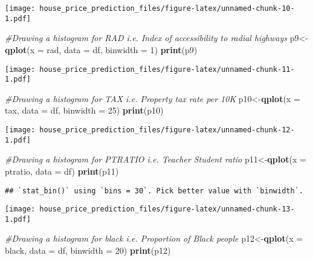 \documentclass[
]{article}
\newenvironment{Shaded}{\begin{snugshade}}{\end{snugshade}}
\newcommand{\CommentTok}[1]{\textcolor[rgb]{0.56,0.35,0.01}{\textit{#1}}}
\newcommand{\DataTypeTok}[1]{\textcolor[rgb]{0.13,0.29,0.53}{#1}}
\newcommand{\DecValTok}[1]{\textcolor[rgb]{0.00,0.00,0.81}{#1}}
\newcommand{\KeywordTok}[1]{\textcolor[rgb]{0.13,0.29,0.53}{\textbf{#1}}}
\newcommand{\NormalTok}[1]{#1}
\begin{document}
\texttt{[image: house\_price\_prediction\_files/figure-latex/unnamed-chunk-10-1.pdf]}

\begin{Shaded}
\begin{Highlighting}[]
\CommentTok{#Drawing a histogram for RAD i.e. Index of accessibility to radial highways}
\NormalTok{p9<-}\KeywordTok{qplot}\NormalTok{(}\DataTypeTok{x =}\NormalTok{ rad, }\DataTypeTok{data =}\NormalTok{ df, }\DataTypeTok{binwidth =} \DecValTok{1}\NormalTok{)}
\KeywordTok{print}\NormalTok{(p9)}
\end{Highlighting}
\end{Shaded}

\texttt{[image: house\_price\_prediction\_files/figure-latex/unnamed-chunk-11-1.pdf]}

\begin{Shaded}
\begin{Highlighting}[]
\CommentTok{#Drawing a histogram for TAX i.e. Property tax rate per 10K}
\NormalTok{p10<-}\KeywordTok{qplot}\NormalTok{(}\DataTypeTok{x =}\NormalTok{ tax, }\DataTypeTok{data =}\NormalTok{ df, }\DataTypeTok{binwidth =} \DecValTok{25}\NormalTok{)}
\KeywordTok{print}\NormalTok{(p10)}
\end{Highlighting}
\end{Shaded}

\texttt{[image: house\_price\_prediction\_files/figure-latex/unnamed-chunk-12-1.pdf]}

\begin{Shaded}
\begin{Highlighting}[]
\CommentTok{#Drawing a histogram for PTRATIO i.e. Teacher Student ratio}
\NormalTok{p11<-}\KeywordTok{qplot}\NormalTok{(}\DataTypeTok{x =}\NormalTok{ ptratio, }\DataTypeTok{data =}\NormalTok{ df)}
\KeywordTok{print}\NormalTok{(p11)}
\end{Highlighting}
\end{Shaded}

\begin{verbatim}
## `stat_bin()` using `bins = 30`. Pick better value with `binwidth`.
\end{verbatim}

\texttt{[image: house\_price\_prediction\_files/figure-latex/unnamed-chunk-13-1.pdf]}

\begin{Shaded}
\begin{Highlighting}[]
\CommentTok{#Drawing a histogram for black i.e. Proportion of Black people}
\NormalTok{p12<-}\KeywordTok{qplot}\NormalTok{(}\DataTypeTok{x =}\NormalTok{ black, }\DataTypeTok{data =}\NormalTok{ df, }\DataTypeTok{binwidth =} \DecValTok{20}\NormalTok{)}
\KeywordTok{print}\NormalTok{(p12)}
\end{Highlighting}
\end{Shaded}
\end{document}

